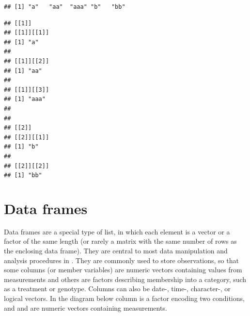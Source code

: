 \documentclass[krantz2]{krantz}\usepackage{knitr}
\begin{document}
\begin{knitrout}\footnotesize
{}\color{fgcolor}\begin{kframe}
\begin{alltt}
\end{alltt}
\begin{verbatim}
## [1] "a"   "aa"  "aaa" "b"   "bb"
\end{verbatim}
\begin{alltt}
\end{alltt}
\begin{verbatim}
## [[1]]
## [[1]][[1]]
## [1] "a"
## 
## [[1]][[2]]
## [1] "aa"
## 
## [[1]][[3]]
## [1] "aaa"
## 
## 
## [[2]]
## [[2]][[1]]
## [1] "b"
## 
## [[2]][[2]]
## [1] "bb"
\end{verbatim}
\end{kframe}
\end{knitrout}



\section{Data frames}\label{sec:R:data:frames}
Data frames are a special type of list, in which each element is a vector or a factor of the same length (or rarely a matrix with the same number of rows as the enclosing data frame). They are central to most data manipulation and analysis procedures in \Rlang. They are commonly used to store observations, so that some columns (or member variables) are numeric vectors containing values from measurements and others are factors describing membership into a category, such as a treatment or genotype. Columns can also be date-, time-, character-, or logical vectors. In the diagram below column  is a factor encoding two conditions, and  and  are numeric vectors containing measurements.
\end{document}
